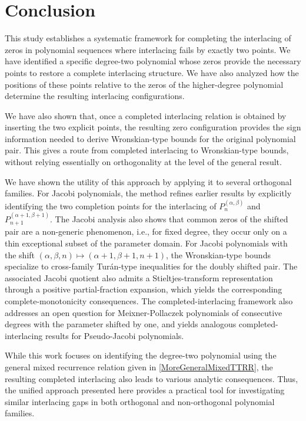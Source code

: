 \documentclass[final,3p,times,12pt]{elsarticle}
\numberwithin{equation}{section}  %
\begin{document}
	

   


	\section{Conclusion}
		This study establishes a systematic framework for completing the interlacing of zeros in polynomial sequences where interlacing fails by exactly two points. We have identified a specific degree-two polynomial whose zeros provide the necessary points to restore a complete interlacing structure. We have also analyzed how the positions of these points relative to the zeros of the higher-degree polynomial determine the resulting interlacing configurations.

        We have also shown that, once a completed interlacing relation is obtained by
		inserting the two explicit points, the resulting zero configuration provides
		the sign information needed to derive Wronskian-type bounds for the original
		polynomial pair. This gives a route from completed interlacing to Wronskian-type bounds, without relying essentially on orthogonality at the level of the general result. 
	
	We have shown the utility of this approach by applying it to several orthogonal families. For Jacobi polynomials, the method refines earlier results by explicitly identifying the two completion points for the interlacing of $P_n^{(\alpha,\beta)}$ and $P_{n+1}^{(\alpha+1,\beta+1)}$. The Jacobi analysis also shows that common zeros of the shifted pair are a non-generic phenomenon, i.e., for fixed degree, they occur only on a thin exceptional subset of the parameter domain. For Jacobi polynomials with the shift $(\alpha,\beta,n)\mapsto(\alpha+1,\beta+1,n+1)$, the Wronskian-type bounds specialize to cross-family Tur\'an-type inequalities for the doubly shifted pair. The associated Jacobi quotient also admits a  Stieltjes-transform representation through a positive partial-fraction expansion, which yields the corresponding complete-monotonicity consequences. The completed-interlacing framework also addresses an open question for Meixner-Pollaczek polynomials of consecutive degrees with the parameter shifted by one, and yields analogous completed-interlacing results for Pseudo-Jacobi polynomials.
		
	While this work focuses on identifying the degree-two polynomial using the general mixed recurrence relation given in \eqref{MoreGeneralMixedTTRR}, the resulting completed interlacing also leads to various analytic consequences. Thus, the unified approach presented here provides a practical tool for investigating similar interlacing gaps in both orthogonal and non-orthogonal polynomial families.
	
	
\end{document}
